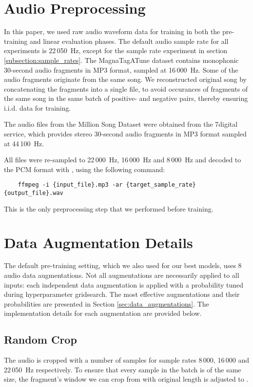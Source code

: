 \documentclass{article}
\begin{document}
\appendix
\section{Audio Preprocessing}
In this paper, we used raw audio waveform data for training in both the pre-training and linear evaluation phases. The default audio sample rate for all experiments is 22\,050~Hz, except for the sample rate experiment in section \ref{subsection:sample_rates}. The Magna\-Tag\-A\-Tune dataset contains monophonic 30-second audio fragments in MP3 format, sampled at 16\,000~Hz. Some of the audio fragments originate from the same song. We reconstructed  original song by concatenating the fragments into a single file, to avoid occurances of fragments of the same song in the same batch of positive- and negative pairs, thereby ensuring i.i.d. data for training.

The audio files from the Million Song Dataset were obtained from the 7digital service, which provides stereo 30-second audio fragments in MP3 format sampled at 44\,100~Hz.

All files were re-sampled to 22\,000~Hz, 16\,000~Hz and 8\,000~Hz and decoded to the PCM format with , using the following command:
\begin{verbatim}
    ffmpeg -i {input_file}.mp3 -ar {target_sample_rate} {output_file}.wav
\end{verbatim}

This is the only preprocessing step that we performed before training.

\section{Data Augmentation Details}
\label{appendix:data_augmentation}
The default pre-training setting, which we also used for our best models, uses 8 audio data augmentations. Not all augmentations are necessarily applied to all inputs: each independent data augmentation is applied with a probability tuned during hyperparameter gridsearch. The most effective augmentations and their probabilities are presented in Section \ref{sec:data_augmentations}. The implementation details for each augmentation are provided below.

\subsection{Random Crop}
The audio is cropped with a number of samples  for sample rates 8\,000, 16\,000 and 22\,050~Hz respectively. To ensure that every sample in the batch is of the same size, the fragment's window we can crop from with original length  is adjusted to .
\end{document}
